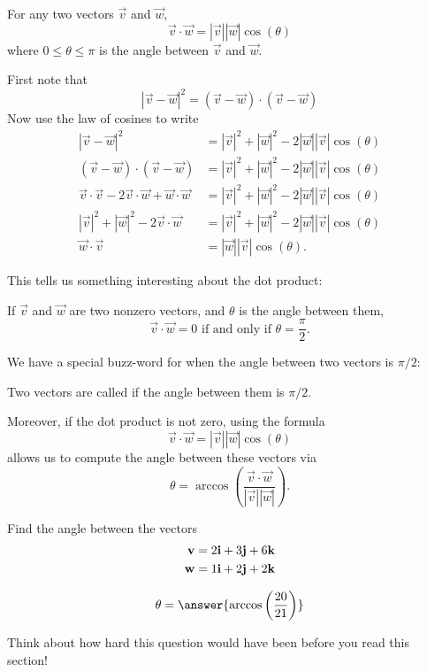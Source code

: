 \documentclass{ximera}
\begin{document}
\begin{theorem}
  For any two vectors $\vec{v}$ and $\vec{w}$,
  \[
  \vec{v} \cdot \vec{w} = |\vec{v}||\vec{w}|\cos(\theta)
  \]
  where $0\le \theta\le\pi$ is the angle between $\vec{v}$ and
  $\vec{w}$.
  \begin{explanation}
    First note that
    \[
    |\vec{v} - \vec{w}|^2 =  (\vec{v} - \vec{w})\cdot(\vec{v} - \vec{w})
    \]
    Now use the law of cosines to write
    \begin{align*}
      |\vec{v} - \vec{w}|^2&=|\vec{v}|^2+|\vec{w}|^2-2|\vec{w}||\vec{v}|\cos(\theta)\\
      (\vec{v} - \vec{w})\cdot(\vec{v} - \vec{w}) &=|\vec{v}|^2+|\vec{w}|^2-2|\vec{w}||\vec{v}|\cos(\theta)\\
      \vec{v}\cdot\vec{v} -2\vec{v}\cdot\vec{w}+\vec{w}\cdot\vec{w}&=|\vec{v}|^2+|\vec{w}|^2-2|\vec{w}||\vec{v}|\cos(\theta)\\
      |\vec{v}|^2+|\vec{w}|^2 -2\vec{v}\cdot\vec{w} &=|\vec{v}|^2+|\vec{w}|^2-2|\vec{w}||\vec{v}|\cos(\theta)\\
      \vec{w} \cdot \vec{v} &= |\vec{w}||\vec{v}|\cos(\theta).
    \end{align*}
  \end{explanation}
\end{theorem}
	
This tells us something interesting about the dot product:

\begin{theorem}
  If $\vec{v}$ and $\vec{w}$ are two nonzero vectors, and $\theta$ is
  the angle between them,
  \[
  \vec{v}\cdot \vec{w} = 0 \text{ if and only if } \theta=
  \frac{\pi}{2}.
  \]
\end{theorem}

We have a special buzz-word for when the angle between two vectors is $\pi/2$:

\begin{definition}
  Two vectors are called  if the angle between them is
  $\pi/2$.
\end{definition}

Moreover, if the dot product is not zero, using the formula
\[
\vec{v} \cdot \vec{w} = |\vec{v}||\vec{w}|\cos(\theta)
\]
allows us to compute the angle between these vectors via
\[
\theta = \arccos\left(\frac{\vec{v} \cdot \vec{w} }{|\vec{v}||\vec{w}|}\right).
\]

\begin{question}
  Find the angle between the vectors
  \begin{align*}
  \mathbf{v} &= 2\mathbf{i}+3\mathbf{j}+6\mathbf{k}\\
  \mathbf{w} &= 1\mathbf{i}+2\mathbf{j}+2\mathbf{k}
  \end{align*}
  \begin{prompt}
  \[
  \theta = \answer{ \arccos\left(\frac{20}{21}\right)}
  \]
  \end{prompt}
  \begin{feedback}
    Think about how hard this question would have been before you read this section!
  \end{feedback}
\end{question}
\end{document}
